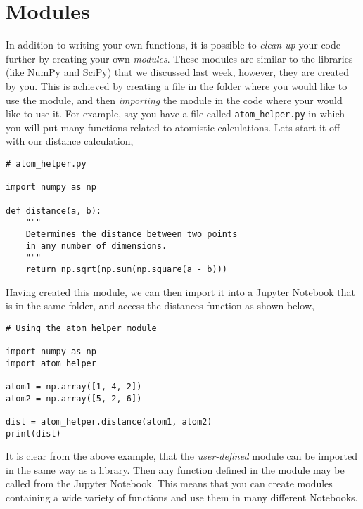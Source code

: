 \documentclass[a4paper]{article}
\begin{document}
\vspace{\baselineskip}
\begin{center}
	\noindent{}
\end{center}
\section{Modules}

In addition to writing your own functions, it is possible to \emph{clean up} your code further by creating your own \emph{modules}.
These modules are similar to the libraries (like NumPy and SciPy) that we discussed last week, however, they are created by you.
This is achieved by creating a file in the folder where you would like to use the module, and then \emph{importing} the module in the code where your would like to use it.
For example, say you have a file called \texttt{atom\_helper.py} in which you will put many functions related to atomistic calculations.
Lets start it off with our distance calculation,
\begin{lstlisting}
# atom_helper.py

import numpy as np

def distance(a, b):
    """
    Determines the distance between two points
    in any number of dimensions.
    """
    return np.sqrt(np.sum(np.square(a - b)))
\end{lstlisting}
Having created this module, we can then import it into a Jupyter Notebook that is in the same folder, and access the distances function as shown below,
\begin{lstlisting}
# Using the atom_helper module

import numpy as np
import atom_helper

atom1 = np.array([1, 4, 2])
atom2 = np.array([5, 2, 6])

dist = atom_helper.distance(atom1, atom2)
print(dist)
\end{lstlisting}
It is clear from the above example, that the \emph{user-defined} module can be imported in the same way as a library.
Then any function defined in the module may be called from the Jupyter Notebook.
This means that you can create modules containing a wide variety of functions and use them in many different Notebooks.
\end{document}
